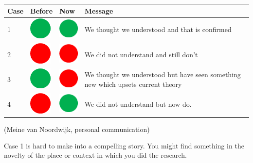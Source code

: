 \documentclass[
]{book}
\begin{document}
\begin{longtable}[]{@{}llll@{}}
\toprule
Case & Before & Now & Message \\
\midrule
\endhead
1 & \includegraphics{img/Green dot.png} & \includegraphics{img/Green dot.png} & We thought we understood and that is confirmed \\
2 & \includegraphics{img/Red dot.png} & \includegraphics{img/Red dot.png} & We did not understand and still don't \\
3 & \includegraphics{img/Green dot.png} & \includegraphics{img/Red dot.png} & We thought we understood but have seen something new which upsets current theory \\
4 & \includegraphics{img/Red dot.png} & \includegraphics{img/Green dot.png} & We did not understand but now do. \\
\bottomrule
\end{longtable}

(Meine van Noordwijk, personal communication)

Case 1 is hard to make into a compelling story. You might find something in the novelty of the place or context in which you did the research.
\end{document}
